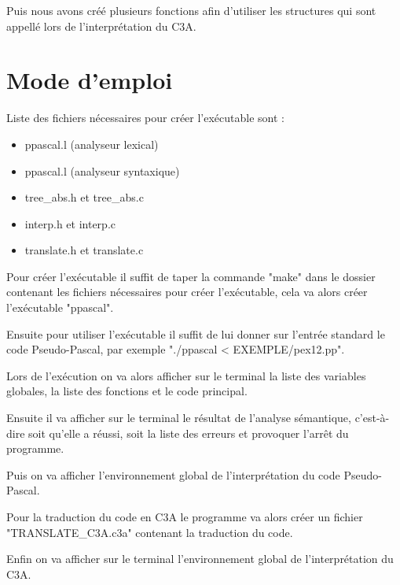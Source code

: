 \documentclass{report}
\begin{document}
Puis nous avons créé plusieurs fonctions afin d'utiliser les structures qui sont appellé lors de l'interprétation du C3A.\\

\newpage
\section{Mode d'emploi}
Liste des fichiers nécessaires pour créer l'exécutable sont :
\begin{itemize}
\item ppascal.l (analyseur lexical)
\item ppascal.l (analyseur syntaxique)
\item tree\_abs.h et tree\_abs.c
\item interp.h et interp.c
\item translate.h et translate.c
\end{itemize}
\bigskip

Pour créer l'exécutable il suffit de taper la commande "make" dans le dossier contenant les fichiers nécessaires pour créer l'exécutable, cela va alors créer l'exécutable "ppascal".

Ensuite pour utiliser l'exécutable il suffit de lui donner sur l'entrée standard le code Pseudo-Pascal, par exemple "./ppascal < EXEMPLE/pex12.pp".

Lors de l'exécution on va alors afficher sur le terminal la liste des variables globales, la liste des fonctions et le code principal.

Ensuite il va afficher sur le terminal le résultat de l'analyse sémantique, c'est-à-dire soit qu'elle a réussi, soit la liste des erreurs et provoquer l'arrêt du programme.

Puis on va afficher l'environnement global de l'interprétation du code Pseudo-Pascal.

Pour la traduction du code en C3A le programme va alors créer un fichier "TRANSLATE\_C3A.c3a" contenant la traduction du code.

Enfin on va afficher sur le terminal l'environnement global de l'interprétation du C3A.
\end{document}
